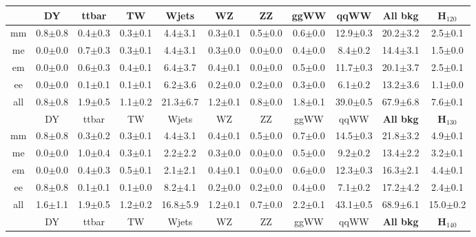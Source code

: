 \begin{table}[!ht]
  \begin{center}
 {\footnotesize
  \begin{tabular} {|c|c|c|c|c|c|c|c|c||c||c|}
\hline
  & DY & ttbar & TW & Wjets & WZ & ZZ & ggWW & qqWW & {\bf All bkg} & {\bf H$_{120}$}\\
  \hline
  mm &  0.8$\pm$0.8 &  0.4$\pm$0.3 &  0.3$\pm$0.1 &  4.4$\pm$3.1 &  0.3$\pm$0.1 &  0.5$\pm$0.0 &  0.6$\pm$0.0 & 12.9$\pm$0.3 & 20.2$\pm$3.2 & 2.5$\pm$0.1 \\
  me &  0.0$\pm$0.0 &  0.7$\pm$0.3 &  0.3$\pm$0.1 &  4.4$\pm$3.1 &  0.3$\pm$0.0 &  0.0$\pm$0.0 &  0.4$\pm$0.0 &  8.4$\pm$0.2 & 14.4$\pm$3.1 & 1.5$\pm$0.0 \\
  em &  0.0$\pm$0.0 &  0.6$\pm$0.3 &  0.4$\pm$0.1 &  6.4$\pm$3.7 &  0.4$\pm$0.1 &  0.0$\pm$0.0 &  0.5$\pm$0.0 & 11.7$\pm$0.3 & 20.1$\pm$3.7 & 2.5$\pm$0.1 \\
  ee &  0.0$\pm$0.0 &  0.1$\pm$0.1 &  0.1$\pm$0.1 &  6.2$\pm$3.6 &  0.2$\pm$0.0 &  0.2$\pm$0.0 &  0.3$\pm$0.0 &  6.1$\pm$0.2 & 13.2$\pm$3.6 & 1.1$\pm$0.0 \\
 \hline
 all &  0.8$\pm$0.8 &  1.9$\pm$0.5 &  1.1$\pm$0.2 & 21.3$\pm$6.7 &  1.2$\pm$0.1 &  0.8$\pm$0.0 &  1.8$\pm$0.1 & 39.0$\pm$0.5 & 67.9$\pm$6.8 & 7.6$\pm$0.1 \\
 \hline
 \hline
  & DY & ttbar & TW & Wjets & WZ & ZZ & ggWW & qqWW & {\bf All bkg} & {\bf H$_{130}$}\\
  \hline
  mm & 0.8$\pm$0.8 &  0.3$\pm$0.2 &  0.3$\pm$0.1 &  4.4$\pm$3.1 &  0.4$\pm$0.1 &  0.5$\pm$0.0 &  0.7$\pm$0.0 & 14.5$\pm$0.3 & 21.8$\pm$3.2 & 4.9$\pm$0.1 \\
  me & 0.0$\pm$0.0 &  1.0$\pm$0.4 &  0.3$\pm$0.1 &  2.2$\pm$2.2 &  0.3$\pm$0.0 &  0.0$\pm$0.0 &  0.5$\pm$0.0 &  9.2$\pm$0.2 & 13.4$\pm$2.2 & 3.2$\pm$0.1 \\
  em & 0.0$\pm$0.0 &  0.4$\pm$0.3 &  0.5$\pm$0.1 &  2.1$\pm$2.1 &  0.4$\pm$0.1 &  0.0$\pm$0.0 &  0.6$\pm$0.0 & 12.3$\pm$0.3 & 16.3$\pm$2.1 & 4.4$\pm$0.1 \\
  ee & 0.8$\pm$0.8 &  0.1$\pm$0.1 &  0.1$\pm$0.0 &  8.2$\pm$4.1 &  0.2$\pm$0.0 &  0.2$\pm$0.0 &  0.4$\pm$0.0 &  7.1$\pm$0.2 & 17.2$\pm$4.2 & 2.4$\pm$0.1 \\
 \hline
 all & 1.6$\pm$1.1 &  1.9$\pm$0.5 &  1.2$\pm$0.2 & 16.8$\pm$5.9 &  1.2$\pm$0.1 &  0.7$\pm$0.0 &  2.2$\pm$0.1 & 43.1$\pm$0.5 & 68.9$\pm$6.1 & 15.0$\pm$0.2 \\
 \hline
 \hline
  & DY & ttbar & TW & Wjets & WZ & ZZ & ggWW & qqWW & {\bf All bkg} & {\bf H$_{140}$}\\

\end{tabular}}
\end{center}
\end{table}
